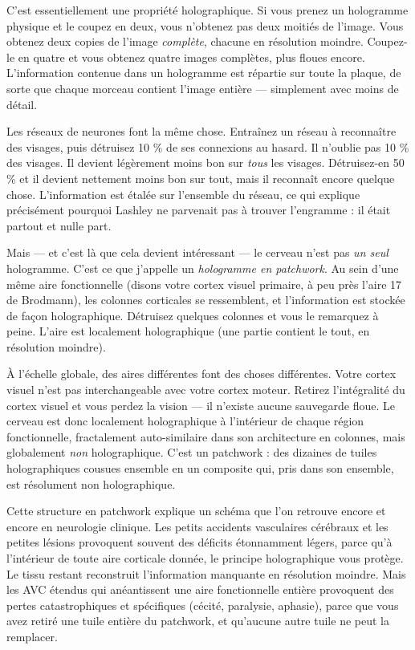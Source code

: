 \documentclass[11pt, twoside, openright]{book}
\begin{document}
C'est essentiellement une propriété holographique. Si vous prenez un hologramme physique et le coupez en deux, vous n'obtenez pas deux moitiés de l'image. Vous obtenez deux copies de l'image \textit{complète}, chacune en résolution moindre. Coupez-le en quatre et vous obtenez quatre images complètes, plus floues encore. L'information contenue dans un hologramme est répartie sur toute la plaque, de sorte que chaque morceau contient l'image entière --- simplement avec moins de détail.

Les réseaux de neurones font la même chose. Entraînez un réseau à reconnaître des visages, puis détruisez 10 \% de ses connexions au hasard. Il n'oublie pas 10 \% des visages. Il devient légèrement moins bon sur \textit{tous} les visages. Détruisez-en 50 \% et il devient nettement moins bon sur tout, mais il reconnaît encore quelque chose. L'information est étalée sur l'ensemble du réseau, ce qui explique précisément pourquoi Lashley ne parvenait pas à trouver l'engramme : il était partout et nulle part.

Mais --- et c'est là que cela devient intéressant --- le cerveau n'est pas \textit{un seul} hologramme. C'est ce que j'appelle un \textit{hologramme en patchwork}. Au sein d'une même aire fonctionnelle (disons votre cortex visuel primaire, à peu près l'aire 17 de Brodmann), les colonnes corticales se ressemblent, et l'information est stockée de façon holographique. Détruisez quelques colonnes et vous le remarquez à peine. L'aire est localement holographique (une partie contient le tout, en résolution moindre).

À l'échelle globale, des aires différentes font des choses différentes. Votre cortex visuel n'est pas interchangeable avec votre cortex moteur. Retirez l'intégralité du cortex visuel et vous perdez la vision --- il n'existe aucune sauvegarde floue. Le cerveau est donc localement holographique à l'intérieur de chaque région fonctionnelle, fractalement auto-similaire dans son architecture en colonnes, mais globalement \textit{non} holographique. C'est un patchwork : des dizaines de tuiles holographiques cousues ensemble en un composite qui, pris dans son ensemble, est résolument non holographique.

Cette structure en patchwork explique un schéma que l'on retrouve encore et encore en neurologie clinique. Les petits accidents vasculaires cérébraux et les petites lésions provoquent souvent des déficits étonnamment légers, parce qu'à l'intérieur de toute aire corticale donnée, le principe holographique vous protège. Le tissu restant reconstruit l'information manquante en résolution moindre. Mais les AVC étendus qui anéantissent une aire fonctionnelle entière provoquent des pertes catastrophiques et spécifiques (cécité, paralysie, aphasie), parce que vous avez retiré une tuile entière du patchwork, et qu'aucune autre tuile ne peut la remplacer.
\end{document}
